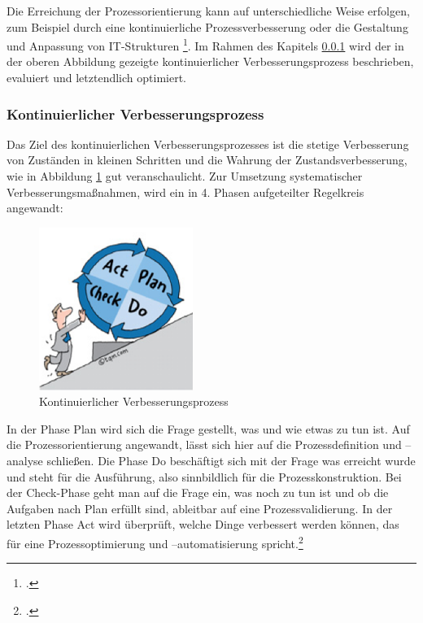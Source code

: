 Die Erreichung der Prozessorientierung kann auf unterschiedliche Weise erfolgen, zum Beispiel durch eine kontinuierliche Prozessverbesserung oder die Gestaltung und Anpassung von IT-Strukturen \footcite[Vgl.][45]{wissensmanagement_2010}. Im Rahmen des Kapitels \ref{subsubsection_kontinuierlicher_verbesserungsprozess}  wird der in der oberen Abbildung gezeigte kontinuierlicher Verbesserungsprozess beschrieben, evaluiert und letztendlich optimiert.


\subsubsection{Kontinuierlicher Verbesserungsprozess}
\label{subsubsection_kontinuierlicher_verbesserungsprozess}
Das Ziel des kontinuierlichen Verbesserungsprozesses ist die stetige Verbesserung von Zuständen in kleinen Schritten und die Wahrung der  Zustandsverbesserung, wie in Abbildung \ref{fig_kontinuierliche_verbesserung} gut veranschaulicht. Zur Umsetzung systematischer Verbesserungsmaßnahmen, wird ein in 4. Phasen aufgeteilter Regelkreis angewandt:

\begin{figure}[h!]
	\centering
	\includegraphics[width=5cm]{kapitel/gruppe1_2/bilder/kontinuierlicher_verbesserungsprozess} 
	\caption{Kontinuierlicher Verbesserungsprozess\protect\footnotemark}
	\label{fig_kontinuierliche_verbesserung}
\end{figure}


In der Phase Plan wird sich die Frage gestellt, was und wie etwas zu tun ist. Auf die Prozessorientierung angewandt, lässt sich hier auf die Prozessdefinition und –analyse schließen. Die Phase Do beschäftigt sich mit der Frage was erreicht wurde und steht für die Ausführung, also sinnbildlich für die Prozesskonstruktion. Bei der Check-Phase geht man auf die Frage ein, was noch zu tun ist und ob die Aufgaben nach Plan erfüllt sind, ableitbar auf eine Prozessvalidierung. In der letzten Phase Act wird überprüft, welche Dinge verbessert werden können, das für eine Prozessoptimierung und –automatisierung spricht.\footcite{yasar_kvp_2015}



